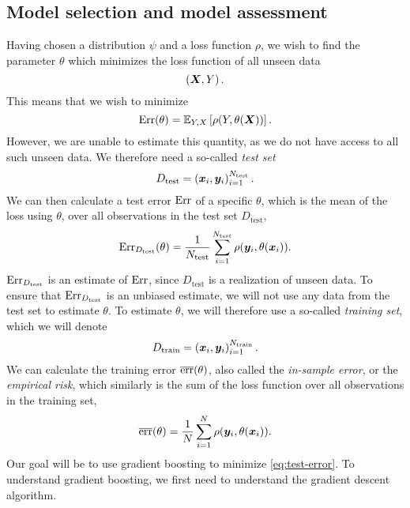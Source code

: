\subsection{Model selection and model assessment}
Having chosen a distribution $\psi$ and a loss function $\rho$, we wish to find the parameter $\theta$ which minimizes the loss function of all unseen data
\begin{equation*}
    \left(\bm{X},Y\right).
\end{equation*}
This means that we wish to minimize
\begin{equation}\label{eq:unseen-error}
    \text{Err}(\theta)=\mathbb{E}_{Y,X}\left[\rho(Y,\theta(\bm{X}))\right].
\end{equation}
However, we are unable to estimate this quantity, as we do not have access to all such unseen data.
We therefore need a so-called \textit{test set}
\begin{equation*}
    D_{\text{test}}=\left(\bm{x}_i,\bm{y}_i\right)_{i=1}^{N_{\text{test}}}.
\end{equation*}
We can then calculate a test error $\text{Err}$ of a specific $\theta$, which is the mean of the loss using $\theta$, over all observations in the test set $D_{\text{test}}$,
\begin{equation}\label{eq:test-error}
    \text{Err}_{D_{\text{test}}}(\theta)=\frac{1}{N_{\text{test}}}\sum_{i=1}^{N_{\text{test}}} \rho(\bm{y}_i,\theta(\bm{x}_i)).
\end{equation}
$\text{Err}_{D_{\text{test}}}$ is an estimate of $\text{Err}$, since $D_{\text{test}}$ is a realization of unseen data.
To ensure that $\text{Err}_{D_{\text{test}}}$ is an unbiased estimate, we will not use any data from the test set to estimate $\theta$.
To estimate $\theta$, we will therefore use a so-called \textit{training set}, which we will denote
\begin{equation*}
    D_{\text{train}}=\left(\bm{x}_i,\bm{y}_i\right)_{i=1}^{N_{\text{train}}}.
\end{equation*}
We can calculate the training error $\overline{\text{err}}(\theta)$, also called the \textit{in-sample error}, or the \textit{empirical risk}, which similarly is the sum of the loss function over all observations in the training set,
\begin{equation*}
    \overline{\text{err}}(\theta)=\frac{1}{N}\sum_{i=1}^{N} \rho(\bm{y}_i,\theta(\bm{x}_i)).
\end{equation*}
Our goal will be to use gradient boosting to minimize \ref{eq:test-error}.
To understand gradient boosting, we first need to understand the gradient descent algorithm.

